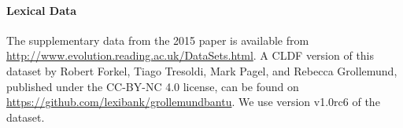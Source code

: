 \documentclass[a4paper,12pt]{scrartcl}
\begin{document}
\paragraph{Lexical Data}
The supplementary data from the 2015 paper is available from
\url{http://www.evolution.reading.ac.uk/DataSets.html}. A CLDF version of this dataset by Robert Forkel, Tiago Tresoldi, Mark Pagel, and Rebecca Grollemund, published under the CC-BY-NC 4.0 license, can be found on \url{https://github.com/lexibank/grollemundbantu}. We use version v1.0rc6 of the dataset.
\end{document}
